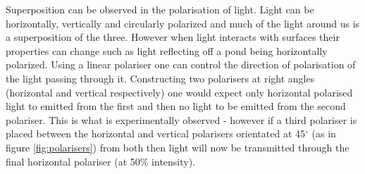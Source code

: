 Superposition can be observed in the polarisation of light. 
Light can be horizontally, vertically and circularly polarized and much of the light around us is a superposition of the three.
However when light interacts with surfaces their properties can change such as light reflecting off a pond being horizontally polarized. 
Using a linear polariser one can control the direction of polarisation of the light passing through it.
Constructing two polarisers at right angles (horizontal and vertical respectively) one would expect only horizontal polarised light to emitted from the first and then no light to be emitted from the second polariser. 
This is what is experimentally observed - however if a third polariser is placed between the horizontal and vertical polarisers orientated at 45$^\circ$ (as in figure \ref{fig:polarisers}) from both then light will now be transmitted through the final horizontal polariser (at 50$\%$ intensity). \cite{noauthor_whatCal_nodate}


